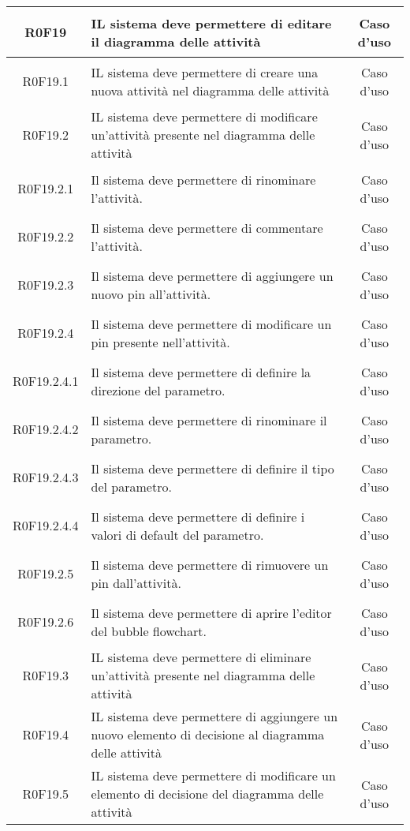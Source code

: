\documentclass[../AnalisiDeiRequisiti.tex]{subfiles}
\begin{document}
\begin{longtable}{|c|>{\centering}p{7cm}|c|}
	\hypertarget{R0F19}{R0F19} & IL sistema deve permettere di editare il diagramma delle attività & Caso d'uso \\ \hline
	\hypertarget{R0F19.1}{R0F19.1} & IL sistema deve permettere di creare una nuova attività nel diagramma delle attività & Caso d'uso \\ \hline
	\hypertarget{R0F19.2}{R0F19.2} & IL sistema deve permettere di modificare un'attività presente nel diagramma delle attività & Caso d'uso \\ \hline
	\hypertarget{R0F19.2.1}{R0F19.2.1} & Il sistema deve permettere di rinominare l'attività. & Caso d'uso \\ \hline
	\hypertarget{R0F19.2.2}{R0F19.2.2} & Il sistema deve permettere di commentare l'attività. & Caso d'uso \\ \hline
	\hypertarget{R0F19.2.3}{R0F19.2.3} & Il sistema deve permettere di aggiungere un nuovo pin all'attività. & Caso d'uso \\ \hline
	\hypertarget{R0F19.2.4}{R0F19.2.4} & Il sistema deve permettere di modificare un pin presente nell'attività. & Caso d'uso \\ \hline
	\hypertarget{R0F19.2.4.1}{R0F19.2.4.1} & Il sistema deve permettere di definire la direzione del parametro. & Caso d'uso \\ \hline
	\hypertarget{R0F19.2.4.2}{R0F19.2.4.2} & Il sistema deve permettere di rinominare il parametro. & Caso d'uso \\ \hline
	\hypertarget{R0F19.2.4.3}{R0F19.2.4.3} & Il sistema deve permettere di definire il tipo del parametro. & Caso d'uso \\ \hline
	\hypertarget{R0F19.2.4.4}{R0F19.2.4.4} & Il sistema deve permettere di definire i valori di default del parametro. & Caso d'uso \\ \hline
	\hypertarget{R0F19.2.5}{R0F19.2.5} & Il sistema deve permettere di rimuovere un pin dall'attività. & Caso d'uso \\ \hline
	\hypertarget{R0F19.2.6}{R0F19.2.6} & Il sistema deve permettere di aprire l'editor del bubble flowchart. & Caso d'uso \\ \hline
	\hypertarget{R0F19.3}{R0F19.3} & IL sistema deve permettere di eliminare un'attività presente nel diagramma delle attività & Caso d'uso \\ \hline
	\hypertarget{R0F19.4}{R0F19.4} & IL sistema deve permettere di aggiungere un nuovo elemento di decisione al diagramma delle attività & Caso d'uso \\ \hline
	\hypertarget{R0F19.5}{R0F19.5} & IL sistema deve permettere di modificare un elemento di decisione del diagramma delle attività & Caso d'uso \\ \hline

\end{longtable}
\end{document}
